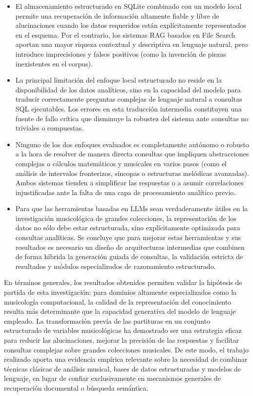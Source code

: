 \begin{itemize}
    \item El almacenamiento estructurado en SQLite combinado con un modelo local permite una recuperación de información altamente fiable y libre de alucinaciones cuando los datos requeridos están explícitamente representados en el esquema. Por el contrario, los sistemas RAG basados en File Search aportan una mayor riqueza contextual y descriptiva en lenguaje natural, pero introduce imprecisiones y falsos positivos (como la invención de piezas inexistentes en el corpus).
    
    \item La principal limitación del enfoque local estructurado no reside en la disponibilidad de los datos analíticos, sino en la capacidad del modelo para traducir correctamente preguntas complejas de lenguaje natural a consultas SQL ejecutables. Los errores en esta traducción intermedia constituyen una fuente de fallo crítica que disminuye la robustez del sistema ante consultas no triviales o compuestas.
    
    \item Ninguno de los dos enfoques evaluados es completamente autónomo o robusto a la hora de resolver de manera directa consultas que impliquen abstracciones complejas o cálculos matemáticos y musicales en varios pasos (como el análisis de intervalos fronterizos, síncopas o estructuras melódicas avanzadas). Ambos sistemas tienden a simplificar las respuestas o a asumir correlaciones injustificadas ante la falta de una capa de procesamiento analítico previo.
    
    \item Para que las herramientas basadas en LLMs sean verdaderamente útiles en la investigación musicológica de grandes colecciones, la representación de los datos no sólo debe estar estructurada, sino explícitamente optimizada para consultas analíticas. Se concluye que para mejorar estas herramientas y sus resultados es necesario un diseño de arquitecturas intermedias que combinen de forma híbrida la generación guiada de consultas, la validación estricta de resultados y módulos especializados de razonamiento estructurado.
\end{itemize}

En términos generales, los resultados obtenidos permiten validar la hipótesis de partida de esta investigación: para dominios altamente especializados como la musicología computacional, la calidad de la representación del conocimiento resulta más determinante que la capacidad generativa del modelo de lenguaje empleado. La transformación previa de las partituras en un conjunto estructurado de variables musicológicas ha demostrado ser una estrategia eficaz para reducir las alucinaciones, mejorar la precisión de las respuestas y facilitar consultas complejas sobre grandes colecciones musicales. De este modo, el trabajo realizado aporta una evidencia empírica relevante sobre la necesidad de combinar técnicas clásicas de análisis musical, bases de datos estructuradas y modelos de lenguaje, en lugar de confiar exclusivamente en mecanismos generales de recuperación documental o búsqueda semántica.

